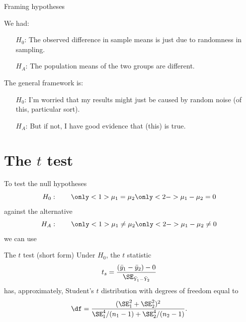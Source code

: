 \begin{frame}{Framing hypotheses}

    We had:
     \begin{itemize}
         \item[$H_0$:] The observed difference in sample means is just due to randomness in sampling.
         \item[$H_A$:] The population means of the two groups are different.
     \end{itemize}

     \vspace{2em}

    The general framework is:
         \begin{itemize}
             \item[$H_0$:] I'm worried that my results might just be caused by random noise (of this, particular sort).
             \item[$H_A$:] But if not, I have good evidence that (this) is true.
         \end{itemize}

\end{frame}

\section{The $t$ test}


\begin{frame}{}

    To test the null hypotheses
    \[  H_0: \qquad \only<1>{\mu_1 = \mu_2} \only<2->{\mu_1 - \mu_2 = 0} \]
    against the alternative
    \[  H_A: \qquad \only<1>{\mu_1 \neq \mu_2} \only<2->{\mu_1 - \mu_2 \neq 0} \]
     \pause
     \pause
    we can use

     \vspace{2em}

     \begin{block}{The $t$ test (short form)}
         Under $H_0$, the \alert{$t$ statistic}
         \[ t_s = \frac{ (\bar y_1 - \bar y_2) - 0 }{ \SE_{\bar Y_1 - \bar Y_2} } \]
         has, approximately, \alert{Student's $t$ distribution}
         with degrees of freedom equal to
         \[ \df = \frac{ (\SE_1^2 + \SE_2^2)^2 }{ \SE_1^4/(n_1-1) + \SE_2^4/(n_2-1) } . \]
     \end{block}

\end{frame}

